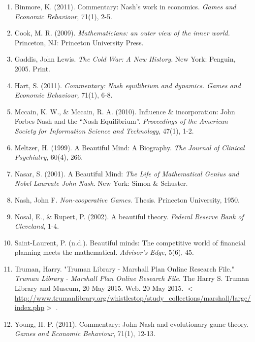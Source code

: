 \documentclass[11pt]{article}
\begin{document}
\begin{enumerate}
\item Binmore, K. (2011). Commentary: Nash's work in economics. \textit{Games and Economic Behaviour}, 71(1), 2-5.
\item Cook, M. R. (2009). \textit{Mathematicians: an outer view of the inner world.} Princeton, NJ: Princeton University Press.
\item Gaddis, John Lewis.  \textit{The Cold War: A New History}. New York: Penguin, 2005. Print.
\item Hart, S. (2011). \textit{Commentary: Nash equilibrium and dynamics. Games and Economic Behaviour,} 71(1), 6-8.
\item Mccain, K. W., \& Mccain, R. A. (2010). Influence \& incorporation: John Forbes Nash and the “Nash Equilibrium”. \textit{Proceedings of the American Society for Information Science and Technology}, 47(1), 1-2.
\item Meltzer, H. (1999). A Beautiful Mind: A Biography. \textit{The Journal of Clinical Psychiatry}, 60(4), 266.
\item Nasar, S. (2001). A Beautiful Mind: \textit{The Life of Mathematical Genius and Nobel Laureate John Nash}. New York: Simon \& Schuster.
\item Nash, John F. \textit{Non-cooperative Games}. Thesis. Princeton University, 1950.
\item Nosal, E., \& Rupert, P. (2002). A beautiful theory. \textit{Federal Reserve Bank of Cleveland}, 1-4.
\item Saint-Laurent, P. (n.d.). Beautiful minds: The competitive world of financial planning meets the mathematical.\textit{ Advisor's Edge}, 5(6), 45.
\item Truman, Harry. "Truman Library - Marshall Plan Online Research File."  \textit{Truman Library - Marshall Plan Online Research File}. The Harry S. Truman Library and Museum, 20 May 2015. Web. 20 May 2015.  $<$ \url{http://www.trumanlibrary.org/whistlestop/study_collections/marshall/large/index.php}$>$ .
\item Young, H. P. (2011). Commentary: John Nash and evolutionary game theory. \textit{Games and Economic Behaviour}, 71(1), 12-13.
\end{enumerate}
\end{document}
